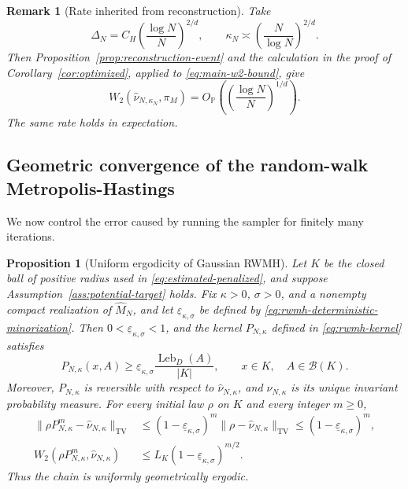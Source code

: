 \documentclass{article}
\newtheorem{proposition}{Proposition}
\newtheorem{remark}{Remark}
\newcommand{\Pp}{\mathbb P}
\newcommand{\TV}{\mathrm{TV}}
\newcommand{\Leb}{\operatorname{Leb}}
\newcommand{\wideM}{\widehat M_N}
\newcommand{\whatnu}{\widehat\nu_{N,\kappa}}
\numberwithin{equation}{section}
\begin{document}
\begin{remark}[Rate inherited from reconstruction]\label{remark:rate}
Take
\[
 \Delta_N=C_H\left(\frac{\log N}{N}\right)^{2/d},
 \qquad
 \kappa_N\asymp\left(\frac{N}{\log N}\right)^{2/d}.
\]
Then Proposition~\ref{prop:reconstruction-event} and the calculation in
the proof of Corollary~\ref{cor:optimized}, applied to
\eqref{eq:main-w2-bound}, give
\[
 W_2(\widehat\nu_{N,\kappa_N},\pi_M)
 =O_{\Pp}\left(\left(\frac{\log N}{N}\right)^{1/d}\right).
\]
The same rate holds in expectation. 
\end{remark}

\subsection{Geometric convergence of the random-walk Metropolis-Hastings}
\label{sec:rwmh-geometric-convergence}

We now control the error caused by running the sampler for finitely many
iterations.

\begin{proposition}[Uniform ergodicity of Gaussian RWMH]
\label{prop:rwmh-geometric}
Let $K$ be the closed ball of positive radius used in
\eqref{eq:estimated-penalized}, and suppose
Assumption~\ref{ass:potential-target} holds. Fix $\kappa>0$, $\sigma>0$,
and a nonempty compact realization of $\wideM$, and let
$\underline\varepsilon_{\kappa,\sigma}$ be defined by
\eqref{eq:rwmh-deterministic-minorization}.
Then $0<\underline\varepsilon_{\kappa,\sigma}<1$, and the kernel
$P_{N,\kappa}$ defined in \eqref{eq:rwmh-kernel} satisfies
\begin{equation}
 P_{N,\kappa}(x,A)
 \ge
 \underline\varepsilon_{\kappa,\sigma}
 \frac{\Leb_D(A)}{|K|},
 \qquad x\in K,\quad A\in\mathcal B(K).
 \label{eq:rwmh-uniform-minorization}
\end{equation}
Moreover, $P_{N,\kappa}$ is reversible with respect to $\whatnu$,
and $\whatnu$ is its unique invariant probability measure. For every
initial law $\rho$ on $K$ and every integer $m\ge0$,
\begin{align}
 \lVert\rho P_{N,\kappa}^{m}-\whatnu\rVert_{\TV}
 &\le(1-\underline\varepsilon_{\kappa,\sigma})^m
      \lVert\rho-\whatnu\rVert_{\TV}
 \le(1-\underline\varepsilon_{\kappa,\sigma})^m,
 \label{eq:rwmh-tv-rate}\\
 W_2(\rho P_{N,\kappa}^{m},\whatnu)
 &\le L_K(1-\underline\varepsilon_{\kappa,\sigma})^{m/2}.
 \label{eq:rwmh-w2-rate}
\end{align}
Thus the chain is uniformly geometrically ergodic. 
\end{proposition}
\end{document}
